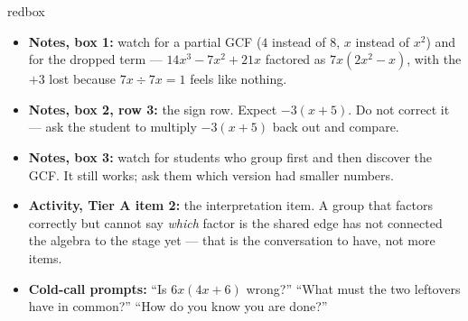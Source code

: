 \documentclass[10pt]{article}
\begin{document}
\begin{skillbox}{redbox}
\begin{itemize}[leftmargin=1.2em, itemsep=2pt, topsep=2pt]
  \item \textbf{Notes, box 1:} watch for a partial GCF ($4$ instead of $8$, $x$ instead of $x^2$)
        and for the dropped term --- $14x^3-7x^2+21x$ factored as $7x\left(2x^2-x\right)$, with the
        $+3$ lost because $7x \div 7x = 1$ feels like nothing.
  \item \textbf{Notes, box 2, row 3:} the sign row. Expect $-3(x+5)$. Do not correct it --- ask the
        student to multiply $-3(x+5)$ back out and compare.
  \item \textbf{Notes, box 3:} watch for students who group first and then discover the GCF. It
        still works; ask them which version had smaller numbers.
  \item \textbf{Activity, Tier A item 2:} the interpretation item. A group that factors correctly
        but cannot say \emph{which} factor is the shared edge has not connected the algebra to the
        stage yet --- that is the conversation to have, not more items.
  \item \textbf{Cold-call prompts:} ``Is $6x(4x+6)$ wrong?'' ``What must the two leftovers have in
        common?'' ``How do you know you are done?''
\end{itemize}
\end{skillbox}
\end{document}
